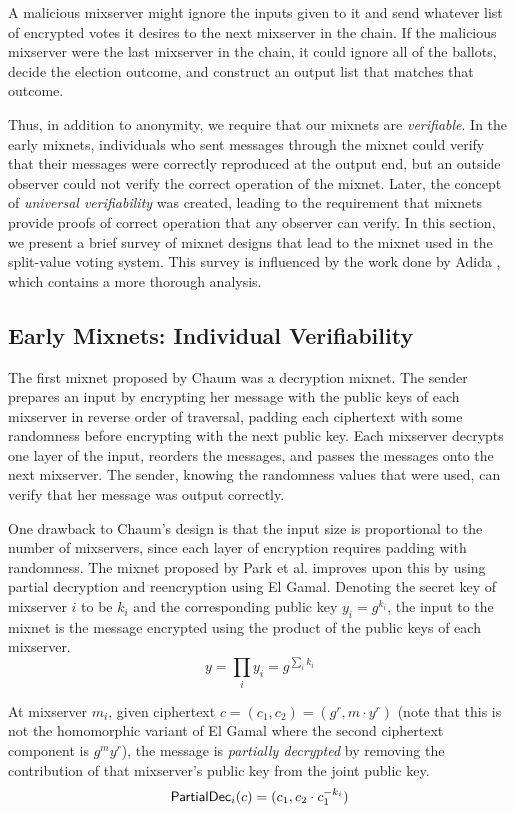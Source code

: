 A malicious mixserver might ignore the inputs given to it and send whatever list of encrypted votes it desires to the next mixserver in the chain. If the malicious mixserver were the last mixserver in the chain, it could ignore all of the ballots, decide the election outcome, and construct an output list that matches that outcome.

Thus, in addition to anonymity, we require that our mixnets are \emph{verifiable}. In the early mixnets, individuals who sent messages through the mixnet could verify that their messages were correctly reproduced at the output end, but an outside observer could not verify the correct operation of the mixnet. Later, the concept of \emph{universal verifiability} was created, leading to the requirement that mixnets provide proofs of correct operation that any observer can verify. In this section, we present a brief survey of mixnet designs that lead to the mixnet used in the split-value voting system. This survey is influenced by the work done by Adida \cite{adida-phd}, which contains a more thorough analysis.

\subsection{Early Mixnets: Individual Verifiability}

The first mixnet proposed by Chaum \cite{chaum81} was a decryption mixnet. The sender prepares an input by encrypting her message with the public keys of each mixserver in reverse order of traversal, padding each ciphertext with some randomness before encrypting with the next public key. Each mixserver decrypts one layer of the input, reorders the messages, and passes the messages onto the next mixserver. The sender, knowing the randomness values that were used, can verify that her message was output correctly.

One drawback to Chaum's design is that the input size is proportional to the number of mixservers, since each layer of encryption requires padding with randomness. The mixnet proposed by Park et al. \cite{park94} improves upon this by using partial decryption and reencryption using El Gamal. Denoting the secret key of mixserver $i$ to be $k_i$ and the corresponding public key $y_i = g^{k_i}$, the input to the mixnet is the message encrypted using the product of the public keys of each mixserver.
$$
y = \prod_{i}{y_i} = g^{\sum_{i}{k_i}}
$$

At mixserver $m_i$, given ciphertext $c = (c_1, c_2) = (g^r, m \cdot y^r)$ (note that this is not the homomorphic variant of El Gamal where the second ciphertext component is $g^m y^r$), the message is \emph{partially decrypted} by removing the contribution of that mixserver's public key from the joint public key.
$$
\operatorname{\mathsf{PartialDec}}_{i}(c) = (c_1, c_2 \cdot c_{1}^{-k_i})
$$

